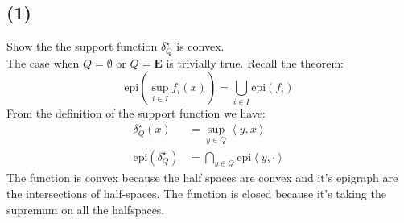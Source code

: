 \documentclass[]{article}
\begin{document}
    \subsection*{(1)}
        Show the the support function $\delta^\star_Q$ is convex. 
        \\[1.1em]
        The case when $Q = \emptyset$ or $Q = \mathbf{E}$ is trivially true. 
        Recall the theorem: 
        $$
            \text{epi}\left(
                \sup_{i \in I}
                    f_i(x)
            \right) = 
            \bigcup_{i \in I} \text{epi}(f_i)
        $$
        From the definition of the support function we have: 
        \begin{align*}\tag{3.5.1}\label{eqn:3.5.1}
            \delta^\star_Q(x) &= \sup_{y \in Q}\left\langle y, x \right\rangle
            \\
            \text{epi}(\delta^\star_Q) &= \bigcap_{y\in Q} \text{epi}\left\langle y, \cdot \right\rangle
        \end{align*} 
        The function is convex because the half spaces are convex and it's epigraph are the intersections of half-spaces. The function is closed because it's taking the supremum on all the halfspaces. 
\end{document}
